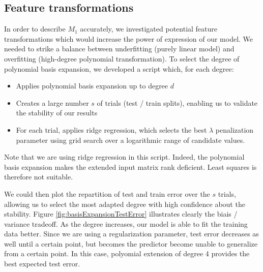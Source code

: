 \documentclass{article} %
\begin{document}
  \subsection{Feature transformations}
  In order to describe $M_1$ accurately, we investigated potential feature transformations which would increase the power of expression of our model. We needed to strike a balance between underfitting (purely linear model) and overfitting (high-degree polynomial transformation). To select the degree of polynomial basis expansion, we developed a script which, for each degree:
  \begin{itemize}
    \item Applies polynomial basis expansion up to degree $d$
    \item Creates a large number $s$ of trials (test / train splits), enabling us to validate the stability of our results
    \item For each trial, applies ridge regression, which selects the best $\lambda$ penalization parameter using grid search over a logarithmic range of candidate values.
  \end{itemize}

  Note that we are using ridge regression in this script. Indeed, the polynomial basis expansion makes the extended input matrix rank deficient. Least squares is therefore not suitable.

  We could then plot the repartition of test and train error over the $s$ trials, allowing us to select the most adapted degree with high confidence about the stability. Figure \ref{fig:basisExpansionTestError} illustrates clearly the biais / variance tradeoff. As the degree increases, our model is able to fit the training data better. Since we are using a regularization parameter, test error decreases as well until a certain point, but becomes the predictor become unable to generalize from a certain point. In this case, polyomial extension of degree 4 provides the best expected test error.
\end{document}
